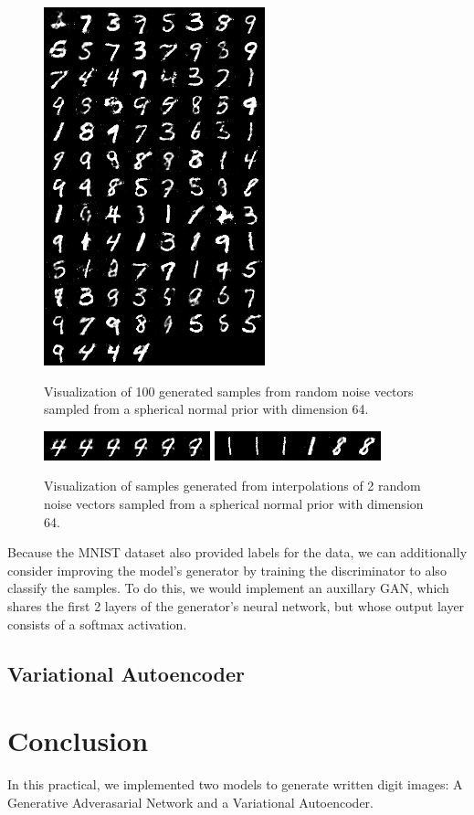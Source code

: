 \documentclass[11pt]{article}
\begin{document}
\begin{figure}[H]
	\begin{center}
		\includegraphics[scale=0.5]{fake_images-200}
		\label{fig:gan-vis}
		\caption{Visualization of 100 generated samples from random noise vectors sampled from a spherical normal prior with dimension 64.}
	\end{center} 
\end{figure}

\begin{figure}[H]
	\begin{center}
		\includegraphics[scale=0.5]{interp_fake_images-1}
		\includegraphics[scale=0.5]{interp_fake_images-2}
		\label{fig:gan-vis}
		\caption{Visualization of samples generated from interpolations of 2 random noise vectors sampled from a spherical normal prior with dimension 64.}
	\end{center} 
\end{figure}

Because the MNIST dataset also provided labels for the data, we can additionally consider improving the model's generator by training the discriminator to also classify the samples. To do this, we would implement an auxillary GAN, which shares the first 2 layers of the generator's neural network, but whose output layer consists of a softmax activation. 

\subsection{Variational Autoencoder} 

\section{Conclusion}
In this practical, we implemented two models to generate written digit images: A Generative Adverasarial Network and a Variational Autoencoder.



\nocite{*}

\end{document}
